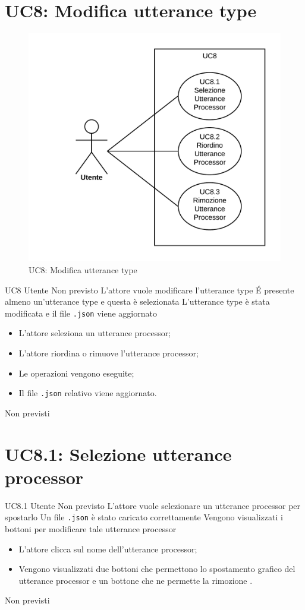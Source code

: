 \documentclass[../AnalisideiRequisiti.tex]{subfiles}
\begin{document}
\section{UC8: Modifica utterance type}
\begin{figure}[H]
	\centering
	\includegraphics[width=\textwidth]{../img/UC8.png}
	\caption{UC8: Modifica utterance type}
\end{figure}
\UserCase
{UC8}
{Utente}
{Non previsto}
{L'attore vuole modificare l'utterance type}
{\'E presente almeno un'utterance type e questa è selezionata }
{L'utterance type è stata modificata e il file \verb|.json| viene aggiornato}
{
	\begin{itemize}
		\item{} L'attore seleziona un utterance processor;
		\item{} L'attore riordina o rimuove l'utterance processor;	
		\item{} Le operazioni vengono eseguite;
		\item{} Il file \verb|.json| relativo viene aggiornato.	
	\end{itemize}
}
{Non previsti}

\section{UC8.1: Selezione utterance processor}
\UserCase
{UC8.1}
{Utente}
{Non previsto}
{L'attore vuole selezionare un utterance processor per spostarlo}
{Un file \verb|.json| è stato caricato correttamente }
{Vengono visualizzati i bottoni per modificare tale utterance processor}
{
	\begin{itemize}
		\item{} L'attore clicca sul nome dell'utterance processor;
		\item{} Vengono visualizzati due bottoni che permettono lo spostamento grafico del utterance processor  e un bottone che ne permette la rimozione . 		
	\end{itemize}
}
{Non previsti}
\end{document}
